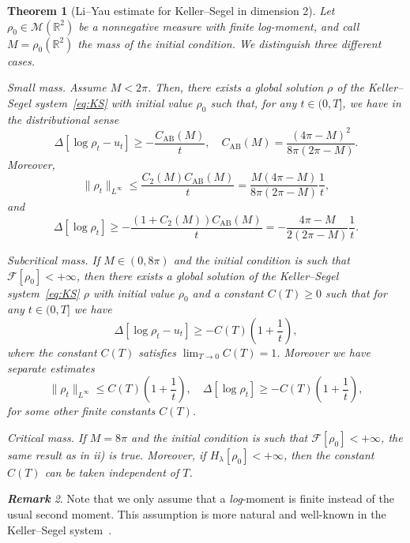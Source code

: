\documentclass[11pt,a4paper]{article}
\numberwithin{equation}{section}
\newcommand{\R}{{\mathbb{R}}}
\theoremstyle{plain}
\newtheorem{theorem}{Theorem}[section]
\theoremstyle{remark}
\newtheorem{remark}[theorem]{\bf Remark}
\newcommand {\f}{\frac}
\begin{document}
\begin{theorem}[Li--Yau estimate for Keller--Segel in dimension 2]\label{thm:Li--Yau}
Let $\rho_{0}\in \mathcal{M}(\R^2)$ be a nonnegative measure with finite log-moment, and call $M=\rho_{0}(\R^2)$ the mass of the initial condition. We distinguish three different cases.  
\begin{enumeratetheorem}

    \item\label{2d_small_mass}
Small mass. Assume $M<2\pi$. Then, there exists a global solution
$\rho$ of the Keller--Segel system~\eqref{eq:KS} with initial value
$\rho_0$ such that, for any $t\in(0,T]$, we have in the
distributional sense
$$
\Delta[\log\rho_t-u_t]
    \ge -\frac{C_{\mathrm{AB}}(M)}{t}, \quad C_{\mathrm{AB}}(M) =\frac{(4\pi-M)^2}{8\pi(2\pi-M)}.
$$
Moreover,
$$
\|\rho_t\|_{L^\infty}
    \le
    \frac{C_2(M)C_{\mathrm{AB}}(M)}{t}
    =
    \frac{M(4\pi-M)}{8\pi(2\pi-M)}\frac{1}{t},
$$
and
$$
\Delta[\log\rho_t]
    \ge
    -\frac{(1+C_2(M))C_{\mathrm{AB}}(M)}{t}
    =
    -\frac{4\pi-M}{2(2\pi-M)}\frac{1}{t}.
$$
    \item\label{2d_full_mass} Subcritical mass. If $M\in(0,8\pi)$ and the initial condition is such that $\mathcal{F}[\rho_0]<+\infty$, then there  exists a global solution of the Keller--Segel system~\eqref{eq:KS} $\rho$ with initial value $\rho_{0}$ and a constant $C(T)\ge 0$ such that for any $t\in (0,T]$ we have
    $$
\Delta [\log \rho_t - u_t]\ge -C(T)\left(1+\f{1}{t}\right),
$$
where the constant $C(T)$ satisfies $\lim_{T\to 0} C(T)=1$.
Moreover we have separate estimates
$$
\|\rho_t\|_{L^{\infty}}\le C(T)\left(1+\f{1}{t}\right),  \quad \Delta [\log \rho_t ]\ge- C(T)\left(1+\f{1}{t}\right),
$$
for some other finite constants $C(T)$.

\item\label{2d_exact_mass} Critical mass. If $M=8\pi$ and the initial condition is such that $\mathcal{F}[\rho_0]<+\infty$, the same result as in {\rm ii)} is true. Moreover, if $H_{\lambda}[\rho_0]  <+\infty$, then the constant $C(T)$ can be taken independent of $T$.


\end{enumeratetheorem}


\end{theorem}

\begin{remark} Note that we only assume that a \textit{log}-moment is finite instead of the usual second moment. This assumption is more natural and well-known in the Keller--Segel
system~\cite{Fernandez_Mischler16,Calvez_Corrias08}. 
\end{remark}
\end{document}
